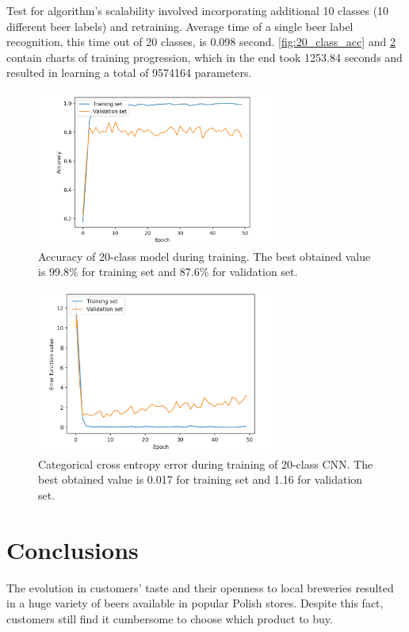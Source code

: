 \documentclass[11pt, a4paper]{article}
\begin{document}
Test for algorithm's scalability involved incorporating additional 10 classes (10 different beer labels) and retraining. Average time of a single beer label recognition, this time out of 20 classes, is 0.098 second. \autoref{fig:20_class_acc} and \ref{fig:20_class_err} contain charts of training progression, which in the end took 1253.84 seconds and resulted in learning a total of 9574164 parameters.

\begin{figure}[h]
\includegraphics[width=0.7\textwidth]{20_class_acc}
\centering
\caption[Dokładność rozpoznawarki 20 różnych etykiet piw]{Accuracy of 20-class model during training. The best obtained value is 99.8\% for training set and 87.6\% for validation set.}
\label{fig:20_class_acc}
\end{figure}

\begin{figure}[h]
\includegraphics[width=0.7\textwidth]{20_class_err}
\centering
\caption[Funkcja błędu rozpoznawarki 20 różnych etykiet piw]{Categorical cross entropy error during training of 20-class CNN. The best obtained value is 0.017 for training set and 1.16 for validation set.}
\label{fig:20_class_err}
\end{figure}
\clearpage

\section{Conclusions} \label{conclusions}
The evolution in customers' taste and their openness to local breweries resulted in a huge variety of beers available in popular Polish stores. Despite this fact, customers still find it cumbersome to choose which product to buy.\\
\end{document}
